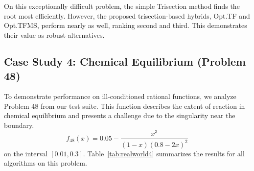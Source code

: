 \documentclass[amsmath, amssymb, aps]{revtex4-2}
\begin{document}
On this exceptionally difficult problem, the simple Trisection method finds the root most efficiently. However, the proposed trisection-based hybrids, Opt.TF and Opt.TFMS, perform nearly as well, ranking second and third. This demonstrates their value as robust alternatives.
    
\subsection*{Case Study 4: Chemical Equilibrium (Problem 48)}
To demonstrate performance on ill-conditioned rational functions, we analyze Problem 48 from our test suite. This function describes the extent of reaction in chemical equilibrium and presents a challenge due to the singularity near the boundary.
\[
f_{48}(x) = 0.05 - \frac{x^3}{(1 - x)(0.8 - 2x)^2}
\]
on the interval $[0.01, 0.3]$. Table~\ref{tab:realworld4} summarizes the results for all algorithms on this problem.
\end{document}
